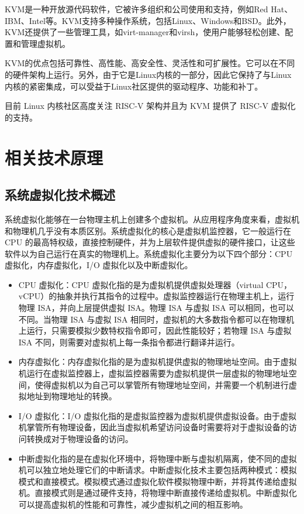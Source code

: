 KVM是一种开放源代码软件，它被许多组织和公司使用和支持，例如Red Hat、IBM、Intel等。KVM支持多种操作系统，包括Linux、Windows和BSD。此外，KVM还提供了一些管理工具，如virt-manager和virsh，使用户能够轻松创建、配置和管理虚拟机。

KVM的优点包括可靠性、高性能、高安全性、灵活性和可扩展性。它可以在不同的硬件架构上运行。另外，由于它是Linux内核的一部分，因此它保持了与Linux内核的紧密集成，可以受益于Linux社区提供的驱动程序、功能和补丁。

目前 Linux 内核社区高度关注 RISC-V 架构并且为 KVM 提供了 RISC-V 虚拟化的支持。



\section{相关技术原理}

\subsection{系统虚拟化技术概述}
系统虚拟化能够在一台物理主机上创建多个虚拟机。从应用程序角度来看，虚拟机和物理机几乎没有本质区别。系统虚拟化的核心是虚拟机监控器，它一般运行在 CPU 的最高特权级，直接控制硬件，并为上层软件提供虚拟的硬件接口，让这些软件以为自己运行在真实的物理机上。系统虚拟化主要分为以下四个部分：CPU 虚拟化，内存虚拟化，I/O 虚拟化以及中断虚拟化。
\begin{itemize}
    \item CPU 虚拟化：CPU 虚拟化指的是为虚拟机提供虚拟处理器（virtual CPU，vCPU）的抽象并执行其指令的过程中。虚拟监控器运行在物理主机上，运行物理 ISA，并向上层提供虚拟 ISA。物理 ISA 与虚拟 ISA 可以相同，也可以不同。当物理 ISA 与虚拟 ISA 相同时，虚拟机的大多数指令都可以在物理机上运行，只需要模拟少数特权指令即可，因此性能较好；若物理 ISA 与虚拟 ISA 不同，则需要对虚拟机上每一条指令都进行翻译并运行。\cite{陈海波2019现代操作系统}
    \item 内存虚拟化：内存虚拟化指的是为虚拟机提供虚拟的物理地址空间。由于虚拟机运行在虚拟监控器上，虚拟监控器需要为虚拟机提供一层虚拟的物理地址空间，使得虚拟机以为自己可以掌管所有物理地址空间，并需要一个机制进行虚拟地址到物理地址的转换。\cite{陈海波2019现代操作系统}
    \item I/O 虚拟化：I/O 虚拟化指的是虚拟监控器为虚拟机提供虚拟设备。由于虚拟机掌管所有物理设备，因此当虚拟机希望访问设备时需要将对于虚拟设备的访问转换成对于物理设备的访问。\cite{陈海波2019现代操作系统}
    \item 中断虚拟化指的是在虚拟化环境中，将物理中断与虚拟机隔离，使不同的虚拟机可以独立地处理它们的中断请求。中断虚拟化技术主要包括两种模式：模拟模式和直接模式。模拟模式通过虚拟化软件模拟物理中断，并将其传递给虚拟机。直接模式则是通过硬件支持，将物理中断直接传递给虚拟机。中断虚拟化可以提高虚拟机的性能和可靠性，减少虚拟机之间的相互影响。\cite{陈海波2019现代操作系统}
\end{itemize}

